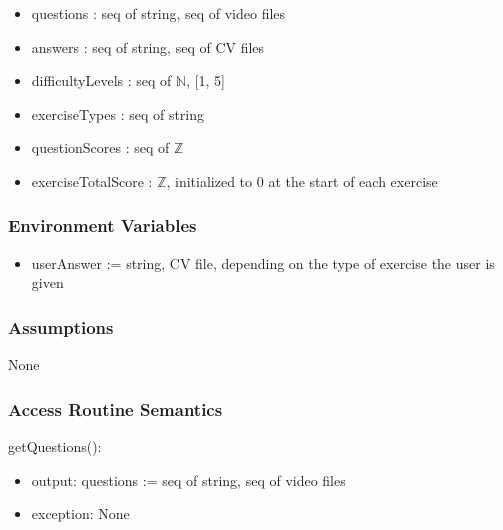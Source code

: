 \documentclass[12pt, titlepage]{article}
\begin{document}
\begin{itemize}
    \item questions : seq of string, seq of video files %
    \item answers : seq of string, seq of CV files %
    \item difficultyLevels :  seq of $\mathbb{N}$, [1, 5] %
    \item exerciseTypes : seq of string %
    \item questionScores : seq of $\mathbb{Z}$  %
    \item exerciseTotalScore : $\mathbb{Z}$, initialized to 0 at the start of each exercise %
\end{itemize}

\subsubsection{Environment Variables}

\begin{itemize}
    \item userAnswer := string, CV file, depending on the type of exercise the user is given 
\end{itemize}

\subsubsection{Assumptions}

None 

\subsubsection{Access Routine Semantics}

\noindent getQuestions():
\begin{itemize}
\item output: questions := seq of string, seq of video files
\item exception: None
\end{itemize}
\end{document}
